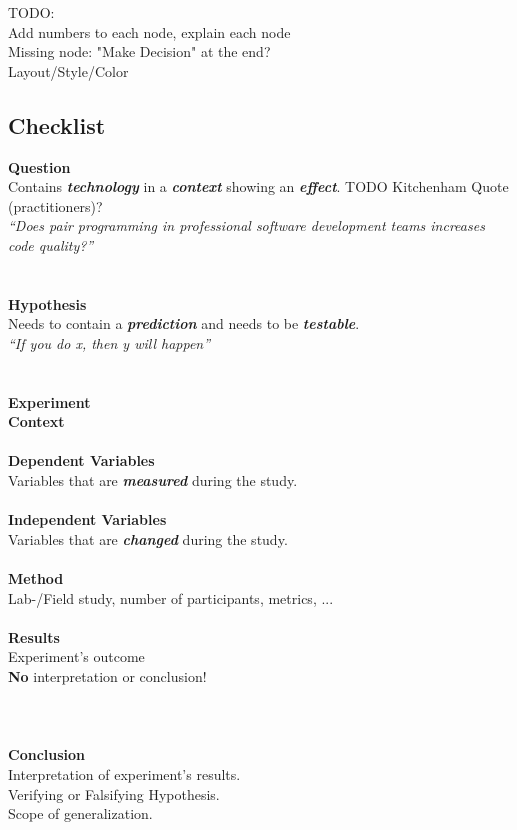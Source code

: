 TODO:\\
Add numbers to each node, explain each node\\
Missing node: "Make Decision" at the end?\\
Layout/Style/Color


\newcommand{\exampleQuote}[1]{\small{\textit{``#1''}}}

\subsection{Checklist}

{\large\textbf{Question}}\\
Contains \textbf{\textit{technology}} in a \textbf{\textit{context}} showing an \textbf{\textit{effect}}. TODO Kitchenham Quote (practitioners)?\\
\exampleQuote{Does pair programming in professional software development teams increases code quality?}
\\
\\
\\
{\large\textbf{Hypothesis}}\\
Needs to contain a \textbf{\textit{prediction}} and needs to be \textbf{\textit{testable}}.\\
\exampleQuote{If you do x, then y will happen}
\\
\\
\\
{\large\textbf{Experiment}}\\
\textbf{Context}\\
\\
\textbf{Dependent Variables}\\
Variables that are  \textbf{\textit{measured}} during the study.\\
\\
\textbf{Independent Variables}\\
Variables that are  \textbf{\textit{changed}} during the study.\\
\\
\textbf{Method}\\
Lab-/Field study, number of participants, metrics, ...\\
\\
\textbf{Results}\\
Experiment's outcome\\
\textbf{No} interpretation or conclusion!\\
\\
\\
\\
{\large\textbf{Conclusion}}\\
Interpretation of experiment's results.\\
Verifying or Falsifying Hypothesis.\\
Scope of generalization.

